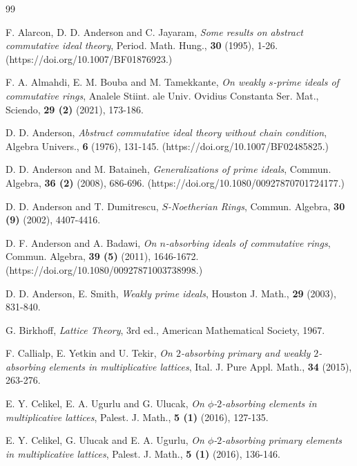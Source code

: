 \documentclass[10pt,twoside,a4paper]{amsart}
\numberwithin{equation}{section}
\theoremstyle{plain}
\theoremstyle{definition}
\begin{document}
\begin{thebibliography}{99}
	
	 F. Alarcon, D. D. Anderson and C. Jayaram, {\it Some results on abstract commutative ideal theory}, Period. Math. Hung., {\bf 30} (1995), 1-26. (https://doi.org/10.1007/BF01876923.)
	
	 F. A. Almahdi, E. M. Bouba and M. Tamekkante, {\it On weakly $s$-prime ideals of commutative rings}, Analele Stiint. ale Univ. Ovidius Constanta Ser. Mat., Sciendo, {\bf 29 (2)} (2021), 173-186.
	
	 D. D. Anderson, {\it Abstract commutative ideal theory without chain condition}, Algebra Univers., {\bf 6} (1976), 131-145. (https://doi.org/10.1007/BF02485825.)
	
	 D. D. Anderson and M. Bataineh, {\it Generalizations of prime ideals}, Commun. Algebra, {\bf 36 (2)} (2008), 686-696. (https://doi.org/10.1080/00927870701724177.)
	
	 D. D. Anderson and T. Dumitrescu, {\it $S$-Noetherian Rings}, Commun. Algebra, {\bf 30 (9)} (2002), 4407-4416.
	
	 D. F. Anderson and A. Badawi, {\it On $n$-absorbing ideals of commutative rings}, Commun. Algebra, {\bf 39 (5)} (2011), 1646-1672. (https://doi.org/10.1080/00927871003738998.)
	
	 D. D. Anderson, E. Smith, \textit{Weakly prime ideals}, Houston J. Math., \textbf{29} (2003), 831-840.
	
	G. Birkhoff,
	\textit{Lattice Theory},
	3rd ed., American Mathematical Society, 1967.
	
	 F. Callialp, E. Yetkin and U. Tekir, {\it On $2$-absorbing primary and weakly $2$-absorbing elements in multiplicative lattices}, Ital. J. Pure Appl. Math., {\bf 34} (2015), 263-276.
	
	 E. Y. Celikel, E. A. Ugurlu and G. Ulucak, {\it On $\phi$-$2$-absorbing elements in multiplicative lattices}, Palest. J. Math., {\bf 5 (1)} (2016), 127-135.
	
	 E. Y. Celikel, G. Ulucak and E. A. Ugurlu, {\it On $\phi$-$2$-absorbing primary elements in multiplicative lattices}, Palest. J. Math., {\bf 5 (1)} (2016), 136-146.
	

\end{thebibliography}
\end{document}
